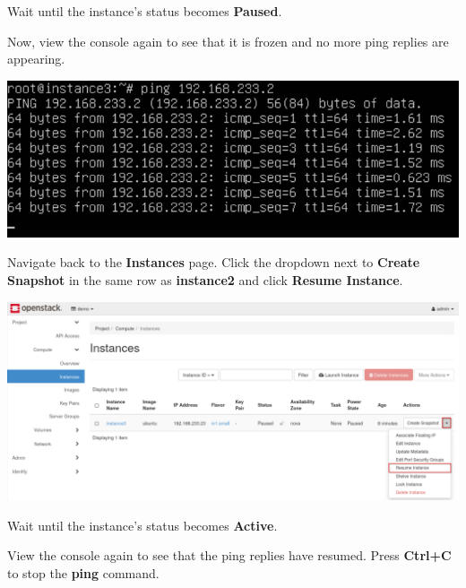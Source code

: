 \documentclass[letterpaper, 12pt]{article}
\begin{document}
\begin{enumerate}
    \begin{stopbox}
        Wait until the instance's status becomes \textbf{Paused}.
    \end{stopbox}

    \begin{labstep}
        Now, view the console again to see that it is frozen and no more ping replies are appearing.

        \begin{center}
            \includegraphics[width=\linewidth]{images/part3/step9.png}
        \end{center}
    \end{labstep}

    \begin{labstep}
        Navigate back to the \textbf{Instances} page.
        Click the dropdown next to \textbf{Create Snapshot} in the same row as \textbf{instance2} and click \textbf{Resume Instance}.

        \begin{center}
            \includegraphics[width=\linewidth]{images/part3/step10.png}
        \end{center}
    \end{labstep}

    \begin{stopbox}
        Wait until the instance's status becomes \textbf{Active}.
    \end{stopbox}

    \begin{labstep}
        View the console again to see that the ping replies have resumed.
        Press \textbf{Ctrl+C} to stop the \textbf{ping} command.


\end{labstep}
\end{enumerate}
\end{document}
